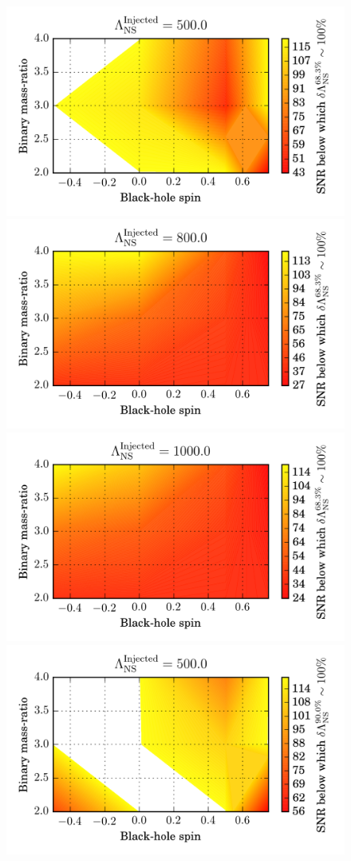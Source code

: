 \documentclass[aps,prd,amsmath,floats,floatfix, twocolumn,
superscriptaddress,nofootinbib,showpacs]{revtex4-1}
\begin{document}
% 
\begin{figure}
\centering    
\includegraphics[width=.65\columnwidth]{plots-TT/TT_SNRThresholdForLambdaMeasurement_BHspin_MassRatio_Lambda500_0_CI68_3.png}
\includegraphics[width=.65\columnwidth]{plots-TT/TT_SNRThresholdForLambdaMeasurement_BHspin_MassRatio_Lambda800_0_CI68_3.png}
\includegraphics[width=.65\columnwidth]{plots-TT/TT_SNRThresholdForLambdaMeasurement_BHspin_MassRatio_Lambda1000_0_CI68_3.png}\\
\includegraphics[width=.65\columnwidth]{plots-TT/TT_SNRThresholdForLambdaMeasurement_BHspin_MassRatio_Lambda500_0_CI90_0.png}

\end{figure}
\end{document}
